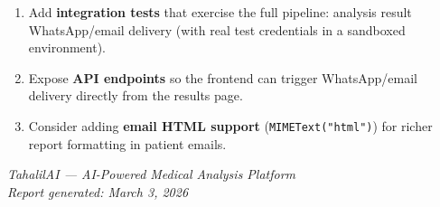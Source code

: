 \documentclass[12pt, a4paper]{article}
\begin{document}
\begin{enumerate}[leftmargin=1.5em, label=\arabic*.]
  \item Add \textbf{integration tests} that exercise the full pipeline:
        analysis result \textrightarrow{} WhatsApp/email delivery (with real test
        credentials in a sandboxed environment).
  \item Expose \textbf{API endpoints} so the frontend can trigger
        WhatsApp/email delivery directly from the results page.
  \item Consider adding \textbf{email HTML support} (\texttt{MIMEText("html")})
        for richer report formatting in patient emails.
\end{enumerate}

\vfill
\begin{center}
  \small\color{gray}
  \textit{TahalilAI — AI-Powered Medical Analysis Platform} \\
  \textit{Report generated: March 3, 2026}
\end{center}
\end{document}
